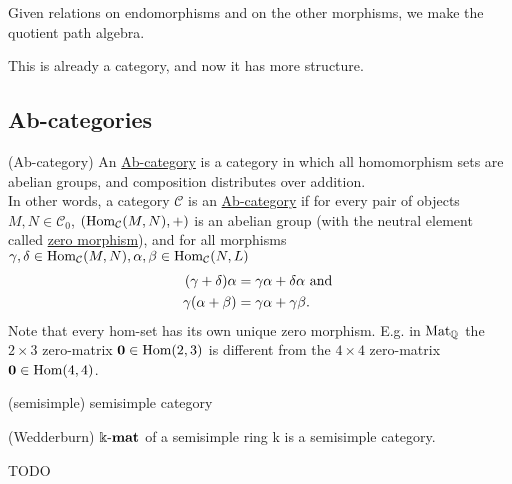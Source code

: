 Given relations on endomorphisms and on the other morphisms, we make the quotient path algebra.

This is already a category, and now it has more structure.

\subsection{Ab-categories}

\begin{definition}{(Ab-category)}
An \ul{Ab-category} is a category in which all homomorphism sets are abelian groups, and composition distributes over addition.\\
In other words, a category $\mathcal{C}$ is an \ul{Ab-category} if for every pair of objects $M,N \in \mathcal{C}_{0}$,
$( \textup{Hom}_{\mathcal{C}}(M,N), + )$ is an abelian group (with the neutral element called \ul{zero morphism}),
and for all morphisms $\gamma, \delta \in \textup{Hom}_{\mathcal{C}}(M,N),
\alpha, \beta \in \textup{Hom}_{\mathcal{C}}(N,L)$
\begin{align}\label{eq:dist}
(\gamma + \delta)\alpha &= \gamma\alpha + \delta\alpha \textup{ and }\\
\gamma(\alpha+\beta) &= \gamma\alpha + \gamma\beta.
\end{align}
Note that every hom-set has its own unique zero morphism. E.g. in $\textup{Mat}_{\mathbb{Q}}$ the $2 \times 3$ zero-matrix
$\mathbf{0} \in \textup{Hom}(2,3)$ is different from the $4 \times 4$ zero-matrix $\mathbf{0} \in \textup{Hom}(4,4)$.
\end{definition}

\begin{definition}{(semisimple)}
semisimple category
\end{definition}

\begin{theorem}{(Wedderburn)}
$\Bbbk\textnormal{-}\mathbf{mat}$ of a semisimple ring k is a semisimple category.
\end{theorem}
TODO

